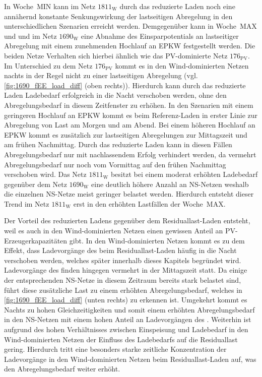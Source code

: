 In Woche~MIN kann im Netz \(1811_{\text{W}}\) durch das reduzierte Laden noch eine annähernd konstante Senkungswirkung der lastseitigen Abregelung in den unterschiedlichen Szenarien erreicht werden.
Demgegenüber kann in Woche~MAX und und im Netz \(1690_{\text{W}}\) eine Abnahme des Einsparpotentials an lastseitiger Abregelung mit einem zunehmenden Hochlauf an \gls{EPKW} festgestellt werden.
Die beiden Netze Verhalten sich hierbei ähnlich wie das \gls{PV}-dominierte Netz \(176_{\text{PV}}\).
Im Unterschied zu dem Netz \(176_{\text{PV}}\) kommt es in den Wind-dominierten Netzen nachts in der Regel nicht zu einer lastseitigen Abregelung (vgl. \autoref{fig:1690_fEE_load_diff} (oben rechts)).
Hierdurch kann durch das reduzierte Laden Ladebedarf erfolgreich in die Nacht verschoben werden, ohne den Abregelungsbedarf in diesem Zeitfenster zu erhöhen.
In den Szenarien mit einem geringeren Hochlauf an \gls{EPKW} kommt es beim Referenz-Laden in erster Linie zur Abregelung von Last am Morgen und am Abend.
Bei einem höheren Hochlauf an \gls{EPKW} kommt es zusätzlich zur lastseitigen Abregelungen zur Mittagszeit und am frühen Nachmittag.
Durch das reduzierte Laden kann in diesen Fällen Abregelungsbedarf nur mit nachlassendem Erfolg verhindert werden, da vermehrt Abregelungsbedarf nur noch vom Vormittag auf den frühen Nachmittag verschoben wird.
Das Netz \(1811_{\text{W}}\) besitzt bei einem moderat erhöhten Ladebedarf gegenüber dem Netz \(1690_{\text{W}}\) eine deutlich höhere Anzahl an \gls{NS}-Netzen weshalb die einzelnen \gls{NS}-Netze meist geringer belastet werden.
Hierdurch entsteht dieser Trend im Netz \(1811_{\text{W}}\) erst in den erhöhten Lastfällen der Woche~MAX.



Der Vorteil des reduzierten Ladens gegenüber dem Residuallast-Laden entsteht, weil es auch in den Wind-dominierten Netzen einen gewissen Anteil an \gls{PV}-Erzeugerkapazitäten gibt.
In den Wind-dominierten Netzen kommt es zu dem Effekt, dass Ladevorgänge des \UC \zH beim Residuallast-Laden häufig in die Nacht verschoben werden, welches später innerhalb dieses Kapitels begründet wird.
Ladevorgänge des \UC \Firmeparkplatz finden hingegen vermehrt in der Mittagszeit statt.
Da einige der entsprechenden \gls{NS}-Netze in diesem Zeitraum bereits stark belastet sind, führt diese zusätzliche Last zu einem erhöhten Abregelungsbedarf, welches in \autoref{fig:1690_fEE_load_diff} (unten rechts) zu erkennen ist.
Umgekehrt kommt es Nachts zu hohen Gleichzeitigkeiten und somit einem erhöhten Abregelungsbedarf in den \gls{NS}-Netzen mit einem hohen Anteil an Ladevorgängen des \UC \zHdot.
Weiterhin ist aufgrund des hohen Verhältnisses zwischen Einspeisung und Ladebedarf in den Wind-dominierten Netzen der Einfluss des Ladebedarfs auf die Residuallast gering.
Hierdurch tritt eine besonders starke zeitliche Konzentration der Ladevorgänge in den Wind-dominierten Netzen beim Residuallast-Laden auf, was den Abregelungsbedarf weiter erhöht.

